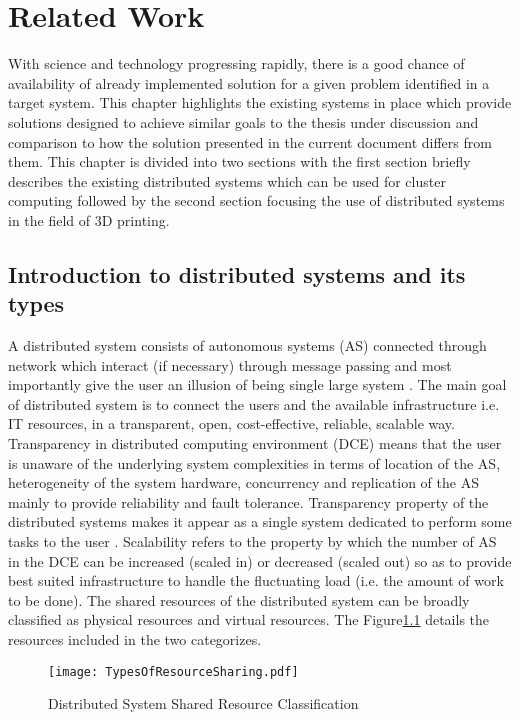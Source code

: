 \chapter{Related Work}

With science and technology progressing rapidly, there is a good chance of availability of already implemented solution for a given problem identified in a target system. This chapter highlights the existing systems in place which provide solutions designed to achieve similar goals to the thesis under discussion and comparison to how the solution presented in the current document differs from them. This chapter is divided into two sections with the first section briefly describes the existing distributed systems which can be used for cluster computing followed by the second section focusing the use of distributed systems in the field of 3D printing.

\section{Introduction to distributed systems and its types}
A distributed system consists of autonomous systems (AS) connected through network which interact (if necessary) through message passing and most importantly give the user an illusion of being single large system \cite{DCE}. The main goal of distributed system is to connect the users and the available infrastructure i.e. IT resources, in a transparent, open, cost-effective, reliable, scalable way. Transparency in distributed computing environment (DCE) means that the user is unaware of the underlying system complexities in terms of location of the AS, heterogeneity of the system hardware, concurrency and replication of the AS mainly to provide reliability and fault tolerance. Transparency property of the distributed systems makes it appear as a single system dedicated to perform some tasks to the user \cite{DSBook}. Scalability refers to the property by which the number of AS in the DCE can be increased (scaled in) or decreased (scaled out) so as to provide best suited infrastructure to handle the fluctuating load (i.e. the amount of work to be done). The shared resources of the distributed system can be broadly classified as physical resources and virtual resources. The Figure\ref{fig:TORS} details the resources included in the two categorizes. 

\begin{figure}[ht!]
\centering
\texttt{[image: TypesOfResourceSharing.pdf]}
\caption{Distributed System Shared Resource Classification}
\label{fig:TORS}
\end{figure}
  
